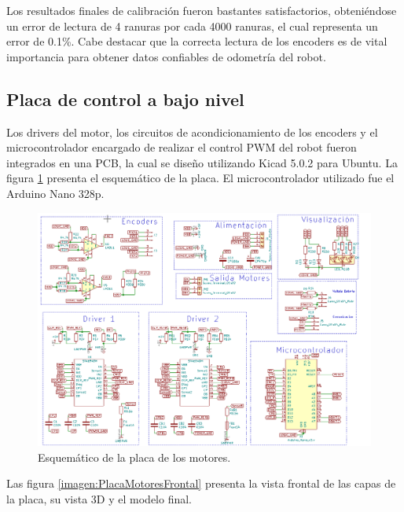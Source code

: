Los resultados finales de calibración fueron bastantes satisfactorios, obteniéndose un error de lectura de 4 ranuras por cada 4000 ranuras, el cual representa un error de 0.1\%.
Cabe destacar que la correcta lectura de los encoders es de vital importancia para obtener datos confiables de odometría del robot.

\subsection{Placa de control a bajo nivel}
Los drivers del motor, los circuitos de acondicionamiento de los encoders y el microcontrolador encargado de realizar el control PWM del robot fueron integrados en una PCB, la cual se diseño utilizando Kicad 5.0.2 para Ubuntu. La figura \ref{imagen:PlacaMotores} presenta el esquemático de la placa. El microcontrolador utilizado fue el Arduino Nano 328p.


\begin{figure}[H]
	\centering		\includegraphics[width=1.0\linewidth]{imagenes/prototipo/Placa/PlacaMotores}
	\caption{Esquemático de la placa de los motores.}
	\label{imagen:PlacaMotores}
\end{figure}

Las figura \ref{imagen:PlacaMotoresFrontal} presenta la vista frontal de las capas de la placa, su vista 3D y el modelo final.




